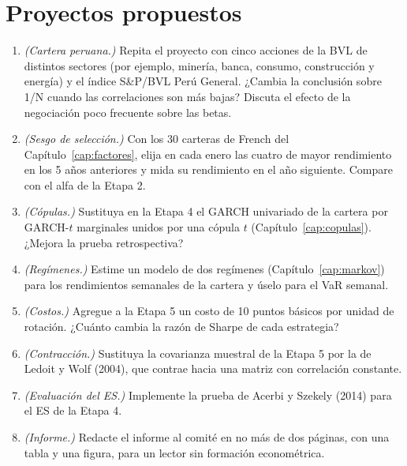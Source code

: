 \section{Proyectos propuestos}

\begin{enumerate}[label=\textbf{\thechapter.\arabic*},leftmargin=*,itemsep=6pt]
  \item \emph{(Cartera peruana.)} Repita el proyecto con cinco acciones de la BVL de distintos sectores (por ejemplo, minería, banca, consumo, construcción y
  energía) y el índice S\&P/BVL Perú General. ¿Cambia la conclusión sobre 1/N cuando las correlaciones son más bajas? Discuta el efecto de la negociación poco
  frecuente sobre las betas.

  \item \emph{(Sesgo de selección.)} Con los 30 carteras de French del Capítulo~\ref{cap:factores}, elija en cada enero las cuatro de mayor rendimiento en los 5 años
  anteriores y mida su rendimiento en el año siguiente. Compare con el alfa de la Etapa 2.

  \item \emph{(Cópulas.)} Sustituya en la Etapa 4 el GARCH univariado de la cartera por GARCH-$t$ marginales unidos por una cópula $t$ (Capítulo~\ref{cap:copulas}).
  ¿Mejora la prueba retrospectiva?

  \item \emph{(Regímenes.)} Estime un modelo de dos regímenes (Capítulo~\ref{cap:markov}) para los rendimientos semanales de la cartera y úselo para el VaR semanal.

  \item \emph{(Costos.)} Agregue a la Etapa 5 un costo de 10 puntos básicos por unidad de rotación. ¿Cuánto cambia la razón de Sharpe de cada estrategia?

  \item \emph{(Contracción.)} Sustituya la covarianza muestral de la Etapa 5 por la de Ledoit y Wolf (2004), que contrae hacia una matriz con correlación constante.

  \item \emph{(Evaluación del ES.)} Implemente la prueba de Acerbi y Szekely (2014) para el ES de la Etapa 4.

  \item \emph{(Informe.)} Redacte el informe al comité en no más de dos páginas, con una tabla y una figura, para un lector sin formación econométrica.
\end{enumerate}

